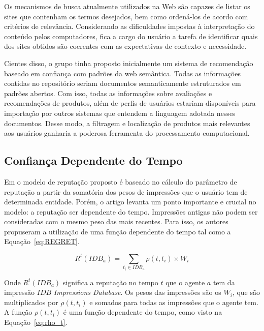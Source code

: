  Os mecanismos de busca atualmente utilizados na Web são capazes de listar os sites que contenham os termos desejados, bem como ordená-los de acordo com critérios de relevância. Considerando as dificuldades impostas à interpretação do conteúdo pelos computadores, fica a cargo do usuário a tarefa de identificar quais dos sites obtidos são coerentes com as expectativas de contexto e necessidade.

 Cientes disso, o grupo tinha proposto inicialmente um sistema de recomendação baseado em confiança com padrões da web semântica. Todas as informações contidas no repositório seriam documentos semanticamente estruturados em padrões abertos. Com isso, todas as informações sobre avaliações e recomendações de produtos, além de perfis de usuários estariam disponíveis para importação por outros sistemas que entendem a linguagem adotada nesses documentos. Desse modo, a filtragem e localização de produtos mais relevantes aos usuários ganharia a poderosa ferramenta do processamento computacional.


\subsection{Confiança Dependente do Tempo} %
\label{sub:confianca_dependente_do_tempo}

 Em \cite{sabater2001regret} o modelo de reputação proposto é baseado no cálculo do parâmetro de reputação a partir da somatória dos pesos de impressões que o usuário tem de determinada entidade. Porém, o artigo levanta um ponto importante e crucial no modelo: a reputação ser dependente do tempo. Impressões antigas não podem ser consideradas com o mesmo peso das mais recentes. Para isso, os autores propuseram a utilização de uma função dependente do tempo tal como a Equação~\ref{eq:REGRET}.
 
\begin{equation}
 R^t(IDB_a) = {\sum_{t_i\in{IDB_a}}}\rho(t,t_i)\times{W_i}
 \label{eq:REGRET} 
\end{equation}

 Onde $R^t(IDB_a)$ significa a reputação no tempo $t$ que o agente $a$ tem da impressão $IDB$ \textit{Impressions Database}. Os pesos das impressões são os $W_i$, que são multiplicados por $\rho(t,t_i)$ e somados para todas as impressões que o agente tem. A função $\rho(t,t_i)$ é uma função dependente do tempo, como visto na Equação~\ref{eq:rho_t}.
 
